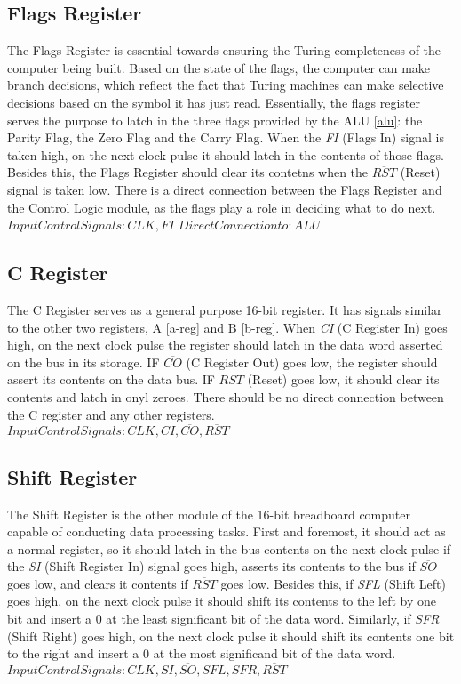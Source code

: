 \subsection{Flags Register} \label{flags}
The Flags Register is essential towards ensuring the Turing completeness of the computer being built. Based on the state of the
flags, the computer can make branch decisions, which reflect the fact that Turing machines can make selective decisions based
on the symbol it has just read.
Essentially, the flags register serves the purpose to latch in the three flags provided by the ALU \ref{alu}: the Parity Flag, the
Zero Flag and the Carry Flag. When the \emph{FI} (Flags In) signal is taken high, on the next clock pulse it should latch in the
contents of those flags. Besides this, the Flags Register should clear its contetns when the \emph{$\overline{RST}$} (Reset) signal
is taken low. There is a direct connection between the Flags Register and the Control Logic module, as the flags play a role in
deciding what to do next. \\
\textbf{$Input Control Signals: CLK, FI$}
\textbf{$Direct Connection to: ALU$}

\subsection{C Register} \label{c-reg}
The C Register serves as a general purpose 16-bit register. It has signals similar to the other two registers, A \ref{a-reg} and
B \ref{b-reg}. When \emph{CI} (C Register In) goes high, on the next clock pulse the register should latch in the data word
asserted on the bus in its storage. IF \emph{$\overline{CO}$} (C Register Out) goes low, the register should assert its contents
on the data bus. IF \emph{$\overline{RST}$} (Reset) goes low, it should clear its contents and latch in onyl zeroes. There should
be no direct connection between the C register and any other registers. \\
\textbf{$Input Control Signals: CLK, CI, \overline{CO}, \overline{RST}$}

\subsection{Shift Register} \label{shift-reg}
The Shift Register is the other module of the 16-bit breadboard computer capable of conducting data processing tasks. First and
foremost, it should act as a normal register, so it should latch in the bus contents on the next clock pulse if the \emph{SI}
(Shift Register In) signal goes high, asserts its contents to the bus if \emph{$\overline{SO}$} goes low, and clears it contents
if \emph{$\overline{RST}$} goes low. Besides this, if \emph{SFL} (Shift Left) goes high, on the next clock pulse it should shift its
contents to the left by one bit and insert a 0 at the least significant bit of the data word. Similarly, if \emph{SFR}
(Shift Right) goes high, on the next clock pulse it should shift its contents one bit to the right and insert a 0 at the most
significand bit of the data word. \\
\textbf{$Input Control Signals: CLK, SI, \overline{SO}, SFL, SFR, \overline{RST}$}

